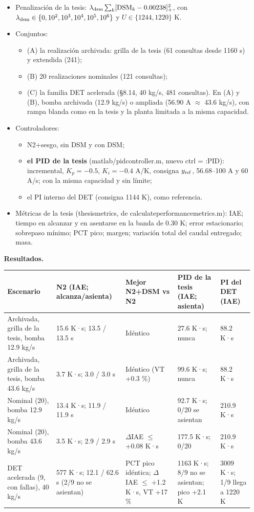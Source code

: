 \documentclass[11pt,a4paper]{article}
\newcommand{\codeus}{\textunderscore\allowbreak}
\newcommand{\code}[1]{{\small\ttfamily\let\_\codeus #1}}
\begin{document}
\begin{itemize}
\item Penalización de la tesis: $\lambda_{\rm dsm}\sum_k[\mathrm{DSM}_k-0.00238]_+^2$, con $\lambda_{\rm dsm}\in\{0,10^2,10^3,10^4,10^5,10^6\}$ y $U\in\{1244,1220\}$ K.
\item Conjuntos:
\begin{itemize}
\item (A) la realización archivada: grilla de la tesis (61 consultas desde 1160 s) y extendida (241);
\item (B) 20 realizaciones nominales (121 consultas);
\item (C) la familia DET acelerada (\S{}8.14, 40 kg/s, 481 consultas). En (A) y (B), bomba archivada (12.9 kg/s) o ampliada (56.90 A $\approx$ 43.6 kg/s), con rampa blanda como en la tesis y la planta limitada a la misma capacidad.
\end{itemize}
\item Controladores:
\begin{itemize}
\item N2+sesgo, sin DSM y con DSM;
\item \textbf{el PID de la tesis} (\code{matlab/pid\_controller.m}, nuevo \code{ctrl = :PID}): incremental, $K_p=-0.5$, $K_i=-0.4$ A/K, consigna $y_{\rm ref}$, 56.68–100 A y 60 A/s; con la misma capacidad y sin límite;
\item el PI interno del DET (consigna 1144 K), como referencia.
\end{itemize}
\item Métricas de la tesis (\code{thesis\_metrics}, de \code{calculate\_performance\_metrics.m}): IAE; tiempo en alcanzar y en asentarse en la banda de 0.30 K; error estacionario; sobrepaso mínimo; PCT pico; margen; variación total del caudal entregado; masa.
\end{itemize}

\textbf{Resultados.}

{\footnotesize
\begin{xltabular}{\linewidth}{@{}YYYYY@{}}
\toprule
\textbf{Escenario} & \textbf{N2 (IAE; alcanza/asienta)} & \textbf{Mejor N2+DSM vs N2} & \textbf{PID de la tesis (IAE; asienta)} & \textbf{PI del DET (IAE)} \\
\midrule
\endhead
Archivada, grilla de la tesis, bomba 12.9 kg/s & 15.6 K·s; 13.5 / 13.5 s & Idéntico & 27.6 K·s; nunca & 88.2 K·s \\
Archivada, grilla de la tesis, bomba 43.6 kg/s & 3.7 K·s; 3.0 / 3.0 s & Idéntico (VT +0.3 \%) & 99.6 K·s; nunca & 88.2 K·s \\
Nominal (20), bomba 12.9 kg/s & 13.4 K·s; 11.9 / 11.9 s & Idéntico & 92.7 K·s; 0/20 se asientan & 210.9 K·s \\
Nominal (20), bomba 43.6 kg/s & 3.5 K·s; 2.9 / 2.9 s & $\Delta$IAE $\le$ +0.08 K·s & 177.5 K·s; 0/20 & 210.9 K·s \\
DET acelerada (9, con fallas), 40 kg/s & 577 K·s; 12.1 / 62.6 s (2/9 no se asientan) & PCT pico idéntica; $\Delta$IAE $\le$ +1.2 K·s, VT +17 \% & 1163 K·s; 8/9 no se asientan; pico +2.1 K & 3009 K·s; 1/9 llega a 1220 K \\
\bottomrule
\end{xltabular}}
\end{document}
